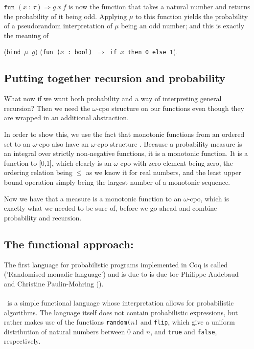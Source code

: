 \documentclass[11pt, leqno, titlepage]{article}
\theoremstyle{definition}
\begin{document}
$\texttt{fun }(x~:~\tau)\Rightarrow g~x~f$ is now the function that takes a natural
number and returns the probability of it being odd. Applying $\mu$ to this function
yields the probability of a pseudorandom interpretation of $\mu$ being an odd
number; and this is exactly the meaning of

(\texttt{bind $\mu$ $g$}) (\texttt{fun
  ($x$ : bool) $\Rightarrow$ if $x$ then 0 else 1}).

\subsection{Putting together recursion and probability}
\label{sec:prob-rec}
What now if we want both probability and a way of interpreting general recursion?
Then we need the $\omega$-cpo structure on our functions even though they are wrapped
in an additional abstraction.

In order to show this, we use the fact that monotonic functions from an ordered set
to an $\omega$-cpo also have an $\omega$-cpo structure \cite[p.~584]{rml-paper}.
Because a probability measure is an integral over strictly non-negative functions, it
is a monotonic function. It is a function to [0,1], which clearly is an $\omega$-cpo
with zero-element being zero, the ordering relation being $\le$ as we know it for
real numbers, and the least upper bound operation simply being the largest number of
a monotonic sequence.

Now we have that a measure is a monotonic function to an $\omega$-cpo, which is
exactly what we needed to be sure of, before we go ahead and combine probability and
recursion. 


\subsection{The functional approach: \rml}\label{sec:rml}
The first language for probabilistic programs implemented in Coq is called \rml
('Randomised monadic language') and is due to is due toe Philippe Audebaud and
Christine Paulin-Mohring (\cite{rml-paper}).
\\ \\
\rml\ is a simple functional language whose interpretation allows for probabilistic
algorithms. The language itself does not contain probabilistic expressions, but
rather makes use of the functions \texttt{random($n$)} and \texttt{flip}, which give
a uniform distribution of natural numbers between 0 and $n$, and \texttt{true} and
\texttt{false}, respectively.
\end{document}
